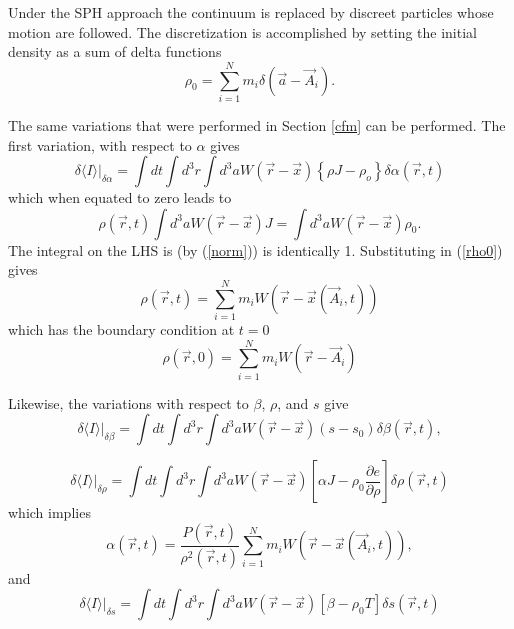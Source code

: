 Under the SPH approach the continuum is replaced by discreet particles whose motion are followed.  The discretization is accomplished by setting the initial density as a sum of delta functions
\begin{equation}\label{rho0}
\rho_0 = \sum_{i=1}^{N} m_i \delta({\vec a} - {\vec A}_i).
\end{equation}

The same variations that were performed in Section \ref{cfm} can be performed.
The first variation, with respect to $\alpha$ gives
\begin{equation}
\delta \langle I \rangle \vert_{\delta \alpha} = \int dt \int d^3r \int d^3a W({\vec r} - {\vec x}) \left\{ \rho J - \rho_o \right\} \delta \alpha({\vec r},t)
\end{equation}
which when equated to zero leads to
\begin{equation}
\rho({\vec r},t) \int d^3a W({\vec r} - {\vec x}) J = \int d^3a W({\vec r} - {\vec x}) \rho_0.
\end{equation}
The integral on the LHS is (by (\ref{norm})) is identically 1.  Substituting in (\ref{rho0}) gives
\begin{equation}
\rho({\vec r},t) = \sum_{i=1}^{N} m_i W({\vec r} - {\vec x}({\vec A}_i,t))
\end{equation}
which has the boundary condition at $t=0$
\begin{equation}
\rho({\vec r},0) = \sum_{i=1}^{N} m_i W({\vec r} - {\vec A}_i)
\end{equation}

Likewise, the variations with respect to $\beta$, $\rho$, and $s$ give
\begin{equation}
\delta \langle I \rangle \vert_{\delta \beta} = \int dt \int d^3r \int d^3a W({\vec r} - {\vec x})(s - s_0) \delta \beta({\vec r},t),
\end{equation}

\begin{equation}
\delta \langle I \rangle \vert_{\delta \rho} = \int dt \int d^3r \int d^3a W({\vec r} - {\vec x}) \left[\alpha J - \rho_0 \frac{\partial e}{\partial \rho} \right] \delta \rho({\vec r},t)
\end{equation}
which implies 
\begin{equation}
\alpha({\vec r},t) = \frac{P({\vec r},t)}{\rho^2({\vec r},t)}\sum_{i=1}^{N} m_i W({\vec r} - {\vec x}({\vec A}_i,t)),
\end{equation}
and
\begin{equation}
\delta \langle I \rangle \vert_{\delta s} = \int dt \int d^3r \int d^3a W({\vec r} - {\vec x}) \left[ \beta - \rho_0 T\right] \delta s({\vec r},t)
\end{equation}

